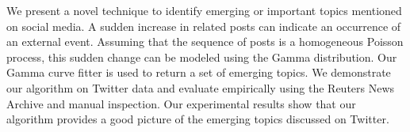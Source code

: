 We present a novel technique to identify emerging or important topics mentioned on social media. A sudden increase in related posts can indicate an occurrence of an external event. Assuming that the sequence of posts is a homogeneous Poisson process, this sudden change can be modeled using the Gamma distribution. Our Gamma curve fitter is used to return a set of emerging topics. We demonstrate our algorithm on Twitter data and evaluate empirically using the Reuters News Archive and manual inspection. Our experimental results show that our algorithm provides a good picture of the emerging topics discussed on Twitter.
